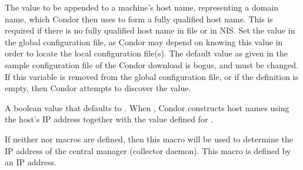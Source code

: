 \begin{description}
\label{param:DefaultDomainName}
\item[\Macro{DEFAULT\_DOMAIN\_NAME}]
  The value to be appended to a machine's host name,
  representing a domain name, which Condor then uses
  to form a fully qualified host name.
  This is required if there is no fully qualified host name 
  in file  or in NIS.
  Set the value in the global configuration file,
  as Condor may depend on knowing this value in order to locate
  the local configuration file(s).
  The default value as given in the sample configuration file of
  the Condor download is bogus, and must be changed.
  If this variable is removed from the global configuration file,
  or if the definition is empty, then Condor attempts to discover
  the value.

\label{param:NoDNS}
\item[\Macro{NO\_DNS}]
  A boolean value that defaults to .
  When , Condor constructs host names using the host's IP address
  together with the value defined for . 

\label{param:CMIPAddr}
\item[\Macro{CM\_IP\_ADDR}]
  If neither  nor 
   macros are defined, then this
  macro will be used to determine the IP address of the central
  manager (collector daemon).
  This macro is defined by an IP address.


\end{description}
